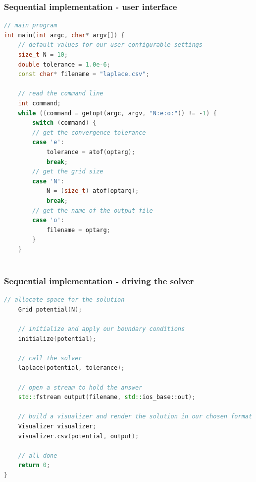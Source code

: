 \begin{frame}[fragile]
%
  \frametitle{Sequential implementation - user interface}
%
  \begin{lstlisting}[language=c++,name=seq:frame,firstnumber=77]
// main program
int main(int argc, char* argv[]) {
    // default values for our user configurable settings
    size_t N = 10;
    double tolerance = 1.0e-6;
    const char* filename = "laplace.csv";

    // read the command line
    int command;
    while ((command = getopt(argc, argv, "N:e:o:")) != -1) {
        switch (command) {
        // get the convergence tolerance
        case 'e':
            tolerance = atof(optarg);
            break;
        // get the grid size
        case 'N':
            N = (size_t) atof(optarg);
            break;
        // get the name of the output file
        case 'o':
            filename = optarg;
        }
    }
    
  \end{lstlisting}
% 
\end{frame}

\begin{frame}[fragile]
%
  \frametitle{Sequential implementation - driving the solver}
%
  \begin{lstlisting}[language=c++,name=seq:frame]
    // allocate space for the solution
    Grid potential(N);

    // initialize and apply our boundary conditions
    initialize(potential);

    // call the solver
    laplace(potential, tolerance);

    // open a stream to hold the answer
    std::fstream output(filename, std::ios_base::out);

    // build a visualizer and render the solution in our chosen format
    Visualizer visualizer;
    visualizer.csv(potential, output);

    // all done
    return 0;
}
  \end{lstlisting}
% 
\end{frame}


